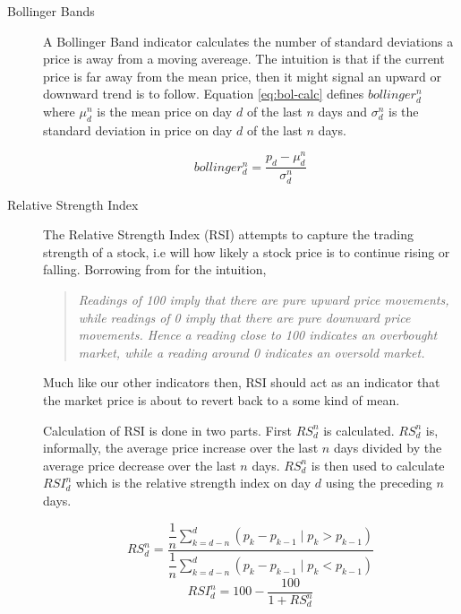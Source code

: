 \documentclass{report}
\begin{document}
\begin{description}
  \item[Bollinger Bands]
  A Bollinger Band indicator calculates the number of standard deviations a price is away from a moving avereage. The intuition is that if the current price is far away from the mean price, then it might signal an upward or downward trend is to follow. Equation \ref{eq:bol-calc} defines $bollinger^{n}_{d}$ where $\mu^{n}_{d}$ is the mean price on day $d$ of the last $n$ days and $\sigma^{n}_{d}$ is the standard deviation in price on day $d$ of the last $n$ days.
  
  \begin{figure}[H]
  \begin{center}
      \begin{equation}
        bollinger^{n}_{d} = \dfrac{p_{d} - \mu^{n}_{d}} {\sigma^{n}_{d}}
        \label{eq:bol-calc}
      \end{equation}
  \end{center}
  \end{figure}  
  
  \item[Relative Strength Index] 
  The Relative Strength Index (RSI) attempts to capture the trading strength of a stock, i.e will how likely a stock price is to continue rising or falling. Borrowing from \citet{wong2003rewarding} for the intuition,
  
  \begin{quotation}
  \textit{Readings of 100 imply that there are pure upward price movements, while readings of 0 imply that there are pure downward price movements. Hence a reading close to 100 indicates an overbought market, while a reading around 0 indicates an oversold market.}
  \end{quotation} 
  
  Much like our other indicators then, RSI should act as an indicator that the market price is about to revert back to a some kind of mean.
  
  Calculation of RSI is done in two parts. First $RS^{n}_{d}$ is calculated. $RS^{n}_{d}$ is, informally, the average price increase over the last $n$ days divided by the average price decrease over the last $n$ days. $RS^{n}_{d}$ is then used to calculate $RSI^{n}_{d}$ which is the relative strength index on day $d$ using the preceding $n$ days.
  
  \begin{figure}[H]
  \begin{center}
      \begin{equation}
        RS^{n}_{d} = \dfrac 
        {\dfrac {1} {n} \sum\limits_{k=d-n}^{d} ( p_{k} - p_{k-1} \mid p_{k} > p_{k-1})} 
        {\dfrac {1} {n} \sum\limits_{k=d-n}^{d} ( p_{k} - p_{k-1} \mid p_{k} < p_{k-1})}  
        \label{eq:rsi-calc}
      \end{equation}
      \begin{equation}
        RSI^{n}_{d} = 100 - \dfrac{100} {1 + RS^{n}_{d}} 
      \end{equation}  
  \end{center}
  \end{figure}  
  
\end{description}
\end{document}
